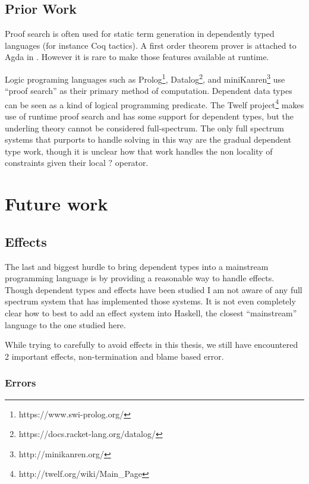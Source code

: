 \subsection{Prior Work}

Proof search is often used for static term generation in dependently
typed languages (for instance Coq tactics). A first order theorem
prover is attached to Agda in \cite{norell2007towards}. However it
is rare to make those features available at runtime. 

Logic programing languages such as Prolog\footnote{https://www.swi-prolog.org/},
Datalog\footnote{https://docs.racket-lang.org/datalog/}, and miniKanren\footnote{http://minikanren.org/}
use ``proof search'' as their primary method of computation. Dependent
data types can be seen as a kind of logical programming predicate.
The Twelf project\footnote{http://twelf.org/wiki/Main\_Page} makes
use of runtime proof search and has some support for dependent types,
but the underling theory cannot be considered full-spectrum. The only
full spectrum systems that purports to handle solving in this way
are the gradual dependent type work\cite{DBLP:journals/corr/abs-1906-06469},
though it is unclear how that work handles the non locality of constraints
given their local $?$ operator.

\section{Future work}


\subsection{Effects}

The last and biggest hurdle to bring dependent types into a mainstream
programming language is by providing a reasonable way to handle effects.
Though dependent types and effects have been studied I am not aware
of any full spectrum system that has implemented those systems. It
is not even completely clear how to best to add an effect system into
Haskell, the closest ``mainstream'' language to the one studied
here.

While trying to carefully to avoid effects in this thesis, we still
have encountered 2 important effects, non-termination and blame based
error.

\subsubsection{Errors}

